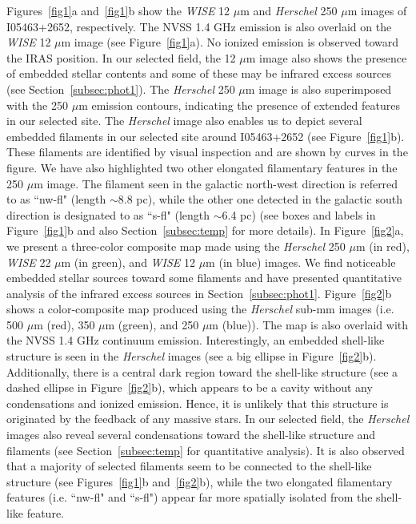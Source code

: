 \documentclass[iop]{emulateapj}
\begin{document}
Figures~\ref{fig1}a and~\ref{fig1}b show the {\it WISE} 12 $\mu$m and {\it Herschel} 250 $\mu$m images of I05463+2652, respectively.
The NVSS 1.4 GHz emission is also overlaid on the {\it WISE} 12 $\mu$m image (see Figure~\ref{fig1}a). 
No ionized emission is observed toward the IRAS position.
In our selected field, the 12 $\mu$m image also shows the presence of embedded stellar contents and some of these may be infrared excess sources (see Section~\ref{subsec:phot1}). 
The {\it Herschel} 250 $\mu$m image is also superimposed with the 250 $\mu$m emission contours, indicating the presence of extended features in our selected site. 
The {\it Herschel} image also enables us to depict several embedded filaments in our selected site around I05463+2652 (see Figure~\ref{fig1}b). These filaments are identified by visual inspection and are shown by curves in the figure. 
We have also highlighted two other elongated filamentary features in the 250 $\mu$m image. 
The filament seen in the galactic north-west direction is referred to as ``nw-fl" (length $\sim$8.8 pc),
while the other one detected in the galactic south direction is designated to as ``s-fl" (length $\sim$6.4 pc) (see boxes and labels in Figure~\ref{fig1}b and also Section~\ref{subsec:temp} for more details).
In Figure~\ref{fig2}a, we present a three-color composite map made using the {\it Herschel} 250 $\mu$m (in red), {\it WISE} 22 $\mu$m (in green), and 
{\it WISE} 12 $\mu$m (in blue) images. We find noticeable embedded stellar sources toward some filaments and have presented quantitative analysis of the infrared excess sources in Section~\ref{subsec:phot1}. 
Figure~\ref{fig2}b shows a color-composite map produced using the {\it Herschel} sub-mm images 
(i.e. 500 $\mu$m (red), 350 $\mu$m (green), and 250 $\mu$m (blue)). The map is also overlaid with the NVSS 1.4 GHz continuum emission. 
Interestingly, an embedded shell-like structure is seen in the {\it Herschel} images (see a big ellipse in Figure~\ref{fig2}b). 
Additionally, there is a central dark region toward the shell-like structure (see a dashed ellipse in 
Figure~\ref{fig2}b), which appears to be a cavity without any condensations and ionized emission.  
Hence, it is unlikely that this structure is originated by the feedback of any massive stars.
In our selected field, the {\it Herschel} images also reveal several condensations toward the shell-like structure and filaments 
(see Section~\ref{subsec:temp} for quantitative analysis).
It is also observed that a majority of selected filaments seem to be connected to the shell-like structure (see Figures~\ref{fig1}b and~\ref{fig2}b), while the two elongated filamentary features (i.e. ``nw-fl" and ``s-fl") appear far more spatially isolated from the shell-like feature.
\end{document}

